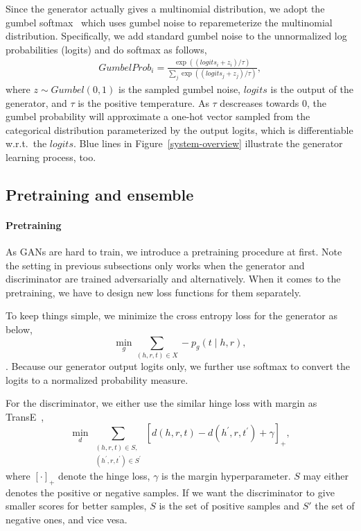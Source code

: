 \documentclass[twocolumn,a4paper,10pt,preprint,3p]{elsarticle}
\begin{document}
Since the generator actually gives a multinomial distribution, we adopt the gumbel softmax~\cite{GumbelSoftmax_Jiang_2016} which uses gumbel noise to reparemeterize the multinomial distribution. Specifically, we add standard gumbel noise to the unnormalized log probabilities (logits) and do softmax as follows,
\begin{align*}
    GumbelProb_i = \frac{\exp((logits_i + z_i)/ \tau)}{\sum_{j}\exp((logits_j + z_j)/ \tau)},
\end{align*}
where $z \sim Gumbel(0, 1)$ is the sampled gumbel noise, $logits$ is the output of the generator, and $\tau$ is the positive temperature. As $\tau$ descreases towards 0, the gumbel probability will approximate a one-hot vector sampled from the categorical distribution parameterized by the output logits, which is differentiable w.r.t.\ the $logits$. Blue lines in Figure~\ref{system-overview} illustrate the generator learning process, too.


\subsection{Pretraining and ensemble}

\paragraph{Pretraining} As GANs are hard to train, we introduce a pretraining procedure at first. Note the setting in previous subsections only works when the generator and discriminator are trained adversarially and alternatively. When it comes to the pretraining, we have to design new loss functions for them separately.

To keep things simple, we minimize the cross entropy loss for the generator as below,
\begin{equation}
    \min_g \sum_{(h, r, t)\in X} -p_g(t \mid h, r), \label{eq:g_pretrain}
\end{equation}.
Because our generator output logits only, we further use softmax to convert the logits to a normalized probability measure.

For the discriminator, we either use the similar hinge loss with margin as TransE~\cite{TransE2013},
\begin{equation}
    \min_d \sum_{\substack{(h, r, t)\in S,\\ (h^\prime, r, t^\prime)\in S^\prime }}
        {[ d(h, r, t) - d(h^\prime, r, t^\prime) + \gamma ]}_+, \label{eq:d_pretrain}
\end{equation}
where ${[\cdot]}_+$ denote the hinge loss, $\gamma$ is the margin hyperparameter. $S$ may either denotes the positive or negative samples. If we want the discriminator to give smaller scores for better samples, $S$ is the set of positive samples and $S'$ the set of negative ones, and vice vesa.
\end{document}
